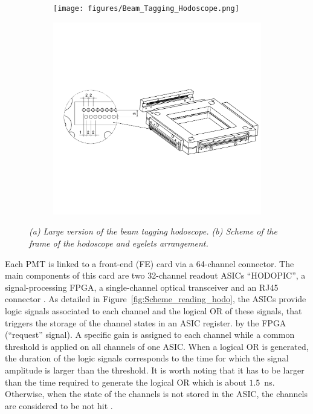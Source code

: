 \documentclass[a4paper,11pt]{article}
\begin{document}
\begin{figure}[htb]
\centering
\begin{subfigure}{0.4\textwidth} \centering
\texttt{[image: figures/Beam\_Tagging\_Hodoscope.png]}\caption{}
\label{fig:hodoscope}
\end{subfigure}
\begin{subfigure}{0.4\textwidth} \centering
\includegraphics[width=\textwidth]{figures/Hodoscope_Frame_Scheme.pdf}\caption{}
\label{fig:frame_hodoscope}
\end{subfigure}
\caption{\small{\textit{(a) Large version of the beam tagging hodoscope. (b) Scheme of the frame of the hodoscope and eyelets arrangement.}}}
\label{fig:Hodoscope}
\end{figure}

Each PMT is linked to a front-end (FE) card via a 64-channel connector. The main components of this card are two 32-channel readout ASICs \enquote{HODOPIC}, a signal-processing FPGA, a single-channel optical transceiver and an RJ45 connector \cite{Chen2019}. As detailed in Figure~\ref{fig:Scheme_reading_hodo}, the ASICs provide logic signals associated to each channel and the logical OR of these signals, that triggers the storage of the channel states in an ASIC register. by the FPGA (\enquote{request} signal). A specific gain is assigned to each channel while a common threshold is applied on all channels of one ASIC. When a logical OR is generated, the duration of the logic signals corresponds to the time for which the signal amplitude is larger than the threshold. It is worth noting that it has to be larger than the time required to generate the logical OR which is about $1.5$~ns. Otherwise, when the state of the channels is not stored in the ASIC, the channels are considered to be not hit .
\end{document}
